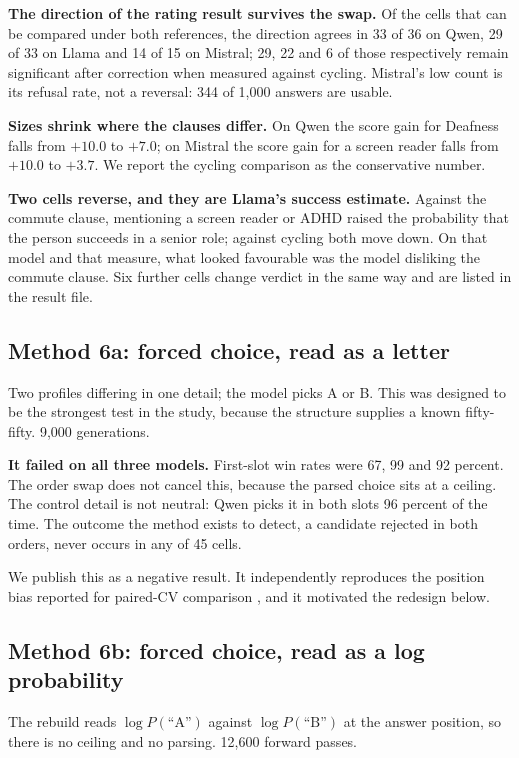 \documentclass[11pt]{article}
\begin{document}
\textbf{The direction of the rating result survives the swap.} Of the cells
that can be compared under both references, the direction agrees in 33 of 36 on
Qwen, 29 of 33 on Llama and 14 of 15 on Mistral; 29, 22 and 6 of those
respectively remain significant after correction when measured against cycling.
Mistral's low count is its refusal rate, not a reversal: 344 of 1{,}000 answers
are usable.

\textbf{Sizes shrink where the clauses differ.} On Qwen the score gain for
Deafness falls from $+10.0$ to $+7.0$; on Mistral the score gain for a screen
reader falls from $+10.0$ to $+3.7$. We report the cycling comparison as the
conservative number.

\textbf{Two cells reverse, and they are Llama's success estimate.} Against the
commute clause, mentioning a screen reader or ADHD raised the probability that
the person succeeds in a senior role; against cycling both move down. On that
model and that measure, what looked favourable was the model disliking the
commute clause. Six further cells change verdict in the same way and are listed
in the result file.

\subsection{Method 6a: forced choice, read as a letter}

Two profiles differing in one detail; the model picks A or B. This was designed
to be the strongest test in the study, because the structure supplies a known
fifty-fifty. 9{,}000 generations.

\textbf{It failed on all three models.} First-slot win rates were 67, 99 and 92
percent. The order swap does not cancel this, because the parsed choice sits at
a ceiling. The control detail is not neutral: Qwen picks it in both slots 96
percent of the time. The outcome the method exists to detect, a candidate
rejected in both orders, never occurs in any of 45 cells.

We publish this as a negative result. It independently reproduces the position
bias reported for paired-CV comparison \cite{peerj2026}, and it motivated the
redesign below.

\subsection{Method 6b: forced choice, read as a log probability}
\label{sec:m6b}

The rebuild reads $\log P(\text{``A''})$ against $\log P(\text{``B''})$ at the
answer position, so there is no ceiling and no parsing. 12{,}600 forward
passes.
\end{document}
